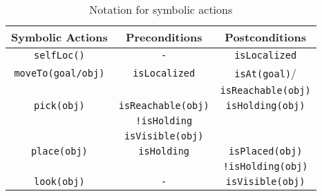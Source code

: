
\begin{table}[ht]
\caption{Notation for symbolic actions}%
\centering %
\begin{tabular}{c c c} %
\toprule
    \textbf{Symbolic Actions}& \textbf{Preconditions}& \textbf{Postconditions}\\ 
    \midrule
    \texttt{selfLoc()} & \texttt{-} & \texttt{isLocalized} \\
    \texttt{moveTo(goal\slash obj)} & \texttt{isLocalized} & \texttt{isAt(goal)}\slash \\
    & & \texttt{isReachable(obj)} \\  
    \texttt{pick(obj)} & \texttt{isReachable(obj)}& \texttt{isHolding(obj)}\\ 
     & \texttt{!isHolding} & \\
     & \texttt{isVisible(obj)} & \\
    \texttt{place(obj)} & \texttt{isHolding}& \texttt{isPlaced(obj)}\\
    &  & \texttt{!isHolding(obj)}\\
    \texttt{look(obj)} & \texttt{-} & \texttt{isVisible(obj)}\\
    \bottomrule
\end{tabular}
\end{table}
%
%

